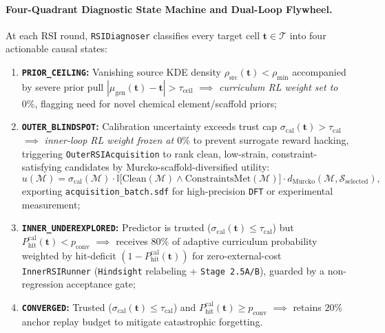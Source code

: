 \documentclass[11pt,a4paper]{article}
\begin{document}
\paragraph{Four-Quadrant Diagnostic State Machine and Dual-Loop Flywheel.}
At each RSI round, \texttt{RSIDiagnoser} classifies every target cell $\mathbf{t} \in \mathcal{T}$ into four actionable causal states:
\begin{enumerate}[leftmargin=1.6em,itemsep=2pt,topsep=2pt]
    \item \textbf{\texttt{PRIOR\_CEILING}:} Vanishing source KDE density $\rho_{\text{src}}(\mathbf{t}) < \rho_{\min}$ accompanied by severe prior pull $|\hat{\mu}_{\text{gen}}(\mathbf{t}) - \mathbf{t}| > \tau_{\text{ceil}}$ $\implies$ \emph{curriculum RL weight set to $0\%$}, flagging need for novel chemical element/scaffold priors;
    \item \textbf{\texttt{OUTER\_BLINDSPOT}:} Calibration uncertainty exceeds trust cap $\sigma_{\text{cal}}(\mathbf{t}) > \tau_{\text{cal}}$ $\implies$ \emph{inner-loop RL weight frozen at $0\%$} to prevent surrogate reward hacking, triggering \texttt{OuterRSIAcquisition} to rank clean, low-strain, constraint-satisfying candidates by Murcko-scaffold-diversified \citep{bemis1996murcko} utility:
    \begin{equation}
    \label{eq:acq}
    u(\mathcal{M}) = \sigma_{\text{cal}}(\mathcal{M}) \cdot \mathbb{I}\big[\text{Clean}(\mathcal{M}) \land \text{ConstraintsMet}(\mathcal{M})\big] \cdot d_{\text{Murcko}}(\mathcal{M}, \mathcal{S}_{\text{selected}}),
    \end{equation}
    exporting \texttt{acquisition\_batch.sdf} for high-precision \texttt{DFT} or experimental measurement;
    \item \textbf{\texttt{INNER\_UNDEREXPLORED}:} Predictor is trusted ($\sigma_{\text{cal}}(\mathbf{t}) \le \tau_{\text{cal}}$) but $P_{\text{hit}}^{\text{cal}}(\mathbf{t}) < p_{\text{conv}}$ $\implies$ receives $80\%$ of adaptive curriculum probability weighted by hit-deficit $(1 - P_{\text{hit}}^{\text{cal}}(\mathbf{t}))$ for zero-external-cost \texttt{InnerRSIRunner} (\texttt{Hindsight} relabeling + \texttt{Stage 2.5A/B}), guarded by a non-regression acceptance gate;
    \item \textbf{\texttt{CONVERGED}:} Trusted ($\sigma_{\text{cal}}(\mathbf{t}) \le \tau_{\text{cal}}$) and $P_{\text{hit}}^{\text{cal}}(\mathbf{t}) \ge p_{\text{conv}}$ $\implies$ retains $20\%$ anchor replay budget to mitigate catastrophic forgetting.
\end{enumerate}
\end{document}
